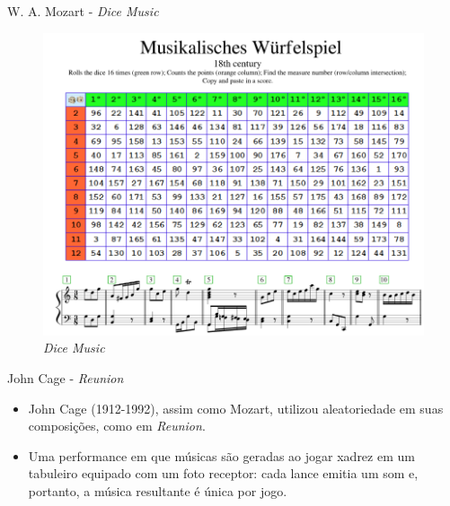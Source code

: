 \documentclass{beamer}
\begin{document}
    \begin{frame}{W. A. Mozart - \textit{Dice Music}}
        \centering
        \begin{figure}
            \includegraphics[scale=0.35]{figuras/dice_music.PNG}
		    \caption{\textit{Dice Music}}
	    \end{figure}
    \end{frame}
    
    \begin{frame}{John Cage - \textit{Reunion}}
        \begin{itemize}
            \justifying
            \item John Cage (1912-1992), assim como Mozart, utilizou aleatoriedade em suas composições, como em \textit{Reunion}.
            \item Uma performance em que músicas são geradas ao jogar xadrez em um tabuleiro equipado com um foto receptor: cada lance emitia um som e, portanto, a música resultante é única por jogo.
        \end{itemize}
    \end{frame}
\end{document}

